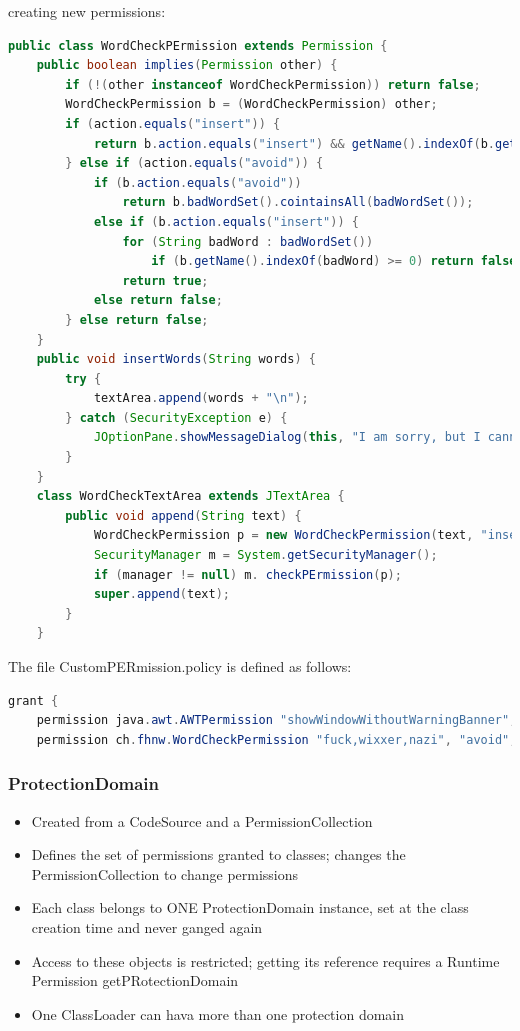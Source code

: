 \documentclass[10pt]{article}
\begin{document}
creating new permissions:
\begin{lstlisting}[language=Java,caption=creating own permissions, style=JavaStyle]
public class WordCheckPErmission extends Permission {
	public boolean implies(Permission other) {
		if (!(other instanceof WordCheckPermission)) return false;
		WordCheckPermission b = (WordCheckPermission) other;
		if (action.equals("insert")) {
			return b.action.equals("insert") && getName().indexOf(b.getName()) >= 0;
		} else if (action.equals("avoid")) {
			if (b.action.equals("avoid"))
				return b.badWordSet().cointainsAll(badWordSet());
			else if (b.action.equals("insert")) {
				for (String badWord : badWordSet())
					if (b.getName().indexOf(badWord) >= 0) return false;
				return true;
			else return false;
		} else return false;
	}
	public void insertWords(String words) {
		try {
			textArea.append(words + "\n");
		} catch (SecurityException e) {
			JOptionPane.showMessageDialog(this, "I am sorry, but I cannot do that.");
		}
	}
	class WordCheckTextArea extends JTextArea {
		public void append(String text) {
			WordCheckPermission p = new WordCheckPermission(text, "insert");
			SecurityManager m = System.getSecurityManager();
			if (manager != null) m. checkPErmission(p);
			super.append(text);
		}
	}
\end{lstlisting}

The file CustomPERmission.policy is defined as follows:

\begin{lstlisting}[language=Java,caption=creating own permissions, style=JavaStyle]
grant {
	permission java.awt.AWTPermission "showWindowWithoutWarningBanner";
	permission ch.fhnw.WordCheckPermission "fuck,wixxer,nazi", "avoid";
\end{lstlisting}

\subsubsection{ProtectionDomain}
\begin{itemize}
	\item Created from a CodeSource and a PermissionCollection
	\item Defines the set of permissions granted to classes; changes the PermissionCollection to change permissions
	\item Each class belongs to ONE ProtectionDomain instance, set at the class creation time and never ganged again
	\item Access to these objects is restricted; getting its reference requires a Runtime Permission getPRotectionDomain
	\item One ClassLoader can hava more than one protection domain
\end{itemize}
\end{document}
